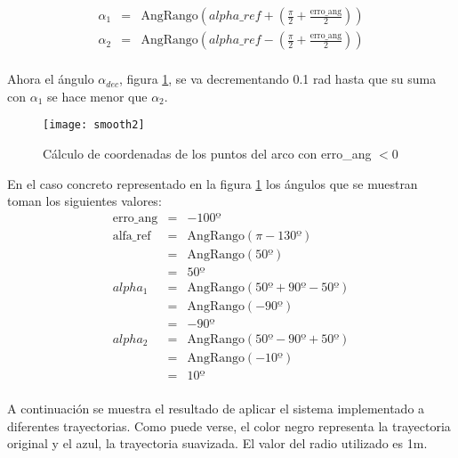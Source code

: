 \begin{eqnarray*}
\alpha_{1}  & = & \mbox{AngRango} \left ( alpha\_ref + 
   \left (\frac{\pi}{2} + \frac{\mbox{erro\_ang}}{2} \right ) \right )\\
 \alpha_{2}  & = & \mbox{AngRango} \left ( alpha\_ref - 
   \left (\frac{\pi}{2} + \frac{\mbox{erro\_ang}}{2} \right ) \right )\\
\end{eqnarray*}

Ahora el ángulo $\alpha_{dec}$, figura \ref{fg:smooth2}, se va decrementando 0.1 rad hasta que su suma con $\alpha_{1}$ se hace menor que $\alpha_{2}$.

\begin{figure}[hbt]
  \centering\texttt{[image: smooth2]}\\
  \caption{Cálculo de coordenadas de los puntos del arco con erro\_ang $< 0$}\label{fg:smooth2}
\end{figure}

En el caso concreto representado en la figura \ref{fg:smooth2} los ángulos que se muestran toman los siguientes valores:
\begin{eqnarray*}
\mbox{erro\_ang}  & = & -100º \\
\mbox{alfa\_ref}     &=  & \mbox{AngRango} (\pi - 130º)\\
                                  & = &\mbox{AngRango} (50º) \\
                                  & = & 50º\\
alpha_{1}                &= & \mbox{AngRango} (50º + 90º - 50º)\\ 
                                 & = & \mbox{AngRango} (-90º)\\
                                 & = & -90º\\ 
alpha_{2}                &= & \mbox{AngRango} (50º - 90º + 50º)\\ 
                                 & = & \mbox{AngRango} (-10º)\\
                                 & = & 10º\\                             
\end{eqnarray*}

\clearpage

A continuación se muestra el resultado de aplicar el sistema implementado a diferentes trayectorias. Como puede verse, el color negro representa la trayectoria original y el azul, la trayectoria suavizada. El valor del radio utilizado es 1m.

